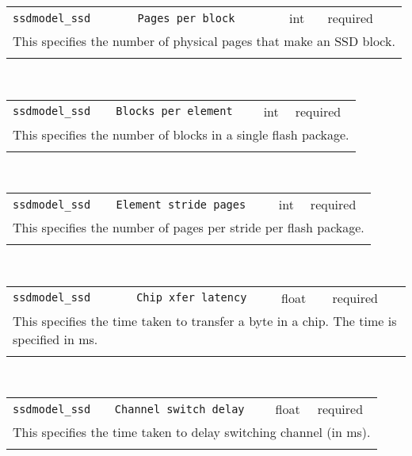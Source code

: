 \noindent 
\begin{tabular}{|p{\lpmodwidth}|p{\lpnamewidth}|p{0.5in}|p{0.5in}|}
\cline{1-4}
\texttt{ssdmodel\_ssd} & \texttt{Pages per block} & int & required \\ 
\cline{1-4}
\multicolumn{4}{|p{6in}|}{
This specifies the number of physical pages that make an SSD block.
}\\ 
\cline{1-4}
\multicolumn{4}{p{5in}}{}\\
\end{tabular}\\ 
\noindent 
\begin{tabular}{|p{\lpmodwidth}|p{\lpnamewidth}|p{0.5in}|p{0.5in}|}
\cline{1-4}
\texttt{ssdmodel\_ssd} & \texttt{Blocks per element} & int & required \\ 
\cline{1-4}
\multicolumn{4}{|p{6in}|}{
This specifies the number of blocks in a single flash package.
}\\ 
\cline{1-4}
\multicolumn{4}{p{5in}}{}\\
\end{tabular}\\ 
\noindent 
\begin{tabular}{|p{\lpmodwidth}|p{\lpnamewidth}|p{0.5in}|p{0.5in}|}
\cline{1-4}
\texttt{ssdmodel\_ssd} & \texttt{Element stride pages} & int & required \\ 
\cline{1-4}
\multicolumn{4}{|p{6in}|}{
This specifies the number of pages per stride per flash package.
}\\ 
\cline{1-4}
\multicolumn{4}{p{5in}}{}\\
\end{tabular}\\ 
\noindent 
\begin{tabular}{|p{\lpmodwidth}|p{\lpnamewidth}|p{0.5in}|p{0.5in}|}
\cline{1-4}
\texttt{ssdmodel\_ssd} & \texttt{Chip xfer latency} & float & required \\ 
\cline{1-4}
\multicolumn{4}{|p{6in}|}{
This specifies the time taken to transfer a byte in a chip. The time
is specified in ms.
}\\ 
\cline{1-4}
\multicolumn{4}{p{5in}}{}\\
\end{tabular}\\ 
\noindent 
\begin{tabular}{|p{\lpmodwidth}|p{\lpnamewidth}|p{0.5in}|p{0.5in}|}
\cline{1-4}
\texttt{ssdmodel\_ssd} & \texttt{Channel switch delay} & float & required \\ 
\cline{1-4}
\multicolumn{4}{|p{6in}|}{
This specifies the time taken to delay switching channel (in ms).
}\\ 
\cline{1-4}
\multicolumn{4}{p{5in}}{}\\
\end{tabular}\\ 

